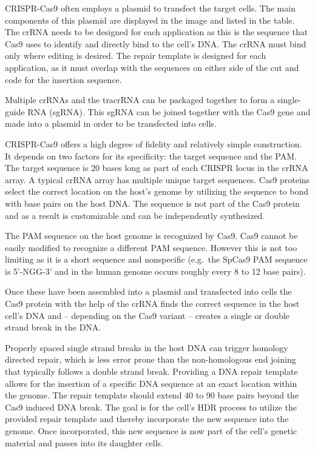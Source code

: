 CRISPR-Cas9 often employs a plasmid to transfect the target cells. The main components of this plasmid are displayed in the image and listed in the table. The crRNA needs to be designed for each application as this is the sequence that Cas9 uses to identify and directly bind to the cell's DNA. The crRNA must bind only where editing is desired. The repair template is designed for each application, as it must overlap with the sequences on either side of the cut and code for the insertion sequence.

Multiple crRNAs and the tracrRNA can be packaged together to form a single-guide RNA (sgRNA). This sgRNA can be joined together with the Cas9 gene and made into a plasmid in order to be transfected into cells.

CRISPR-Cas9 offers a high degree of fidelity and relatively simple construction. It depends on two factors for its specificity: the target sequence and the PAM. The target sequence is 20 bases long as part of each CRISPR locus in the crRNA array. A typical crRNA array has multiple unique target sequences. Cas9 proteins select the correct location on the host's genome by utilizing the sequence to bond with base pairs on the host DNA. The sequence is not part of the Cas9 protein and as a result is customizable and can be independently synthesized.

The PAM sequence on the host genome is recognized by Cas9. Cas9 cannot be easily modified to recognize a different PAM sequence. However this is not too limiting as it is a short sequence and nonspecific (e.g.~the SpCas9 PAM sequence is 5'-NGG-3' and in the human genome occurs roughly every 8 to 12 base pairs).

Once these have been assembled into a plasmid and transfected into cells the Cas9 protein with the help of the crRNA finds the correct sequence in the host cell's DNA and -- depending on the Cas9 variant -- creates a single or double strand break in the DNA.

Properly spaced single strand breaks in the host DNA can trigger homology directed repair, which is less error prone than the non-homologous end joining that typically follows a double strand break. Providing a DNA repair template allows for the insertion of a specific DNA sequence at an exact location within the genome. The repair template should extend 40 to 90 base pairs beyond the Cas9 induced DNA break. The goal is for the cell's HDR process to utilize the provided repair template and thereby incorporate the new sequence into the genome. Once incorporated, this new sequence is now part of the cell's genetic material and passes into its daughter cells.


